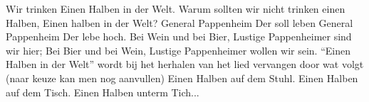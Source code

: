 \beginverse*
Wir trinken
Einen Halben in der Welt.
Warum sollten wir nicht trinken einen Halben,
Einen halben in der Welt?
General Pappenheim 
Der soll leben           
General Pappenheim
Der lebe hoch.             
Bei Wein und bei Bier,
Lustige Pappenheimer sind wir hier;
Bei Bier und bei Wein,
Lustige Pappenheimer wollen wir sein. 
\endverse
\beginchorus
“Einen Halben in der Welt” wordt bij het herhalen van het lied vervangen door wat volgt (naar keuze kan men nog aanvullen)
\endchorus
\beginverse*
Einen Halben auf dem Stuhl.
Einen Halben auf dem Tisch. 
Einen Halben unterm Tich...
\endverse
\endsong